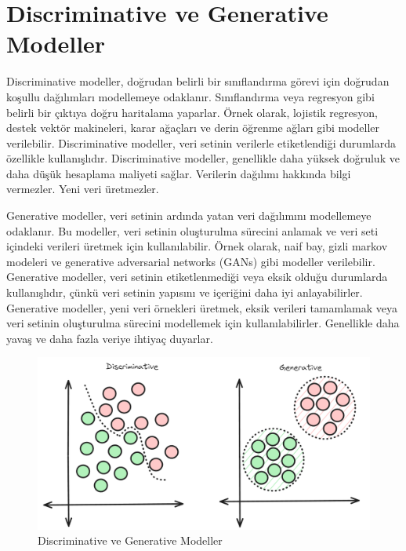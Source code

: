\section{Discriminative ve Generative Modeller}
Discriminative modeller, doğrudan belirli bir sınıflandırma görevi için doğrudan koşullu dağılımları modellemeye odaklanır. Sınıflandırma veya regresyon gibi belirli bir çıktıya doğru haritalama yaparlar. Örnek olarak, lojistik regresyon, destek vektör makineleri, karar ağaçları ve derin öğrenme ağları gibi modeller verilebilir. Discriminative modeller, veri setinin verilerle etiketlendiği durumlarda özellikle kullanışlıdır. Discriminative modeller, genellikle daha yüksek doğruluk ve daha düşük hesaplama maliyeti sağlar. Verilerin dağılımı hakkında bilgi vermezler. Yeni veri üretmezler.

Generative modeller, veri setinin ardında yatan veri dağılımını modellemeye odaklanır. Bu modeller, veri setinin oluşturulma sürecini anlamak ve veri seti içindeki verileri üretmek için kullanılabilir. Örnek olarak, naif bay, gizli markov modeleri ve generative adversarial networks (GANs) gibi modeller verilebilir. Generative modeller, veri setinin etiketlenmediği veya eksik olduğu durumlarda kullanışlıdır, çünkü veri setinin yapısını ve içeriğini daha iyi anlayabilirler. Generative modeller, yeni veri örnekleri üretmek, eksik verileri tamamlamak veya veri setinin oluşturulma sürecini modellemek için kullanılabilirler. Genellikle daha yavaş ve daha fazla veriye ihtiyaç duyarlar.

\begin{figure}[h]
    \centering
    \includegraphics[width=1\textwidth]{images/discriminative_vs_generative_models.png}
    \caption{Discriminative ve Generative Modeller}
    \label{fig:enter-label}
\end{figure}

\newpage